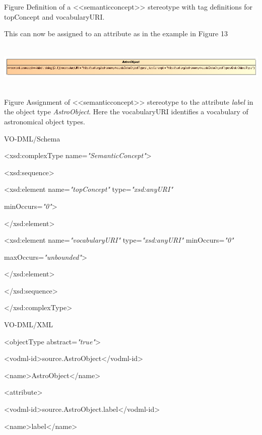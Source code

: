 \documentclass[10pt,a4paper]{ivoa}
\begin{document}
Figure Definition of a
\textless\textless semanticconcept\textgreater\textgreater{} stereotype
with tag definitions for topConcept and vocabularyURI.

This can now be assigned to an attribute as in the example in Figure 13

\includegraphics[width=7.96667in,height=0.86875in]{./media/image18.png}

Figure Assignment of
\textless\textless semanticconcept\textgreater\textgreater{} stereotype
to the attribute \emph{label} in the object type \emph{AstroObject}.
Here the vocabularyURI identifies a vocabulary of astronomical object
types.

VO-DML/Schema

\textless xsd:complexType name=\emph{"SemanticConcept"}\textgreater{}

\textless xsd:sequence\textgreater{}

\textless xsd:element name=\emph{"topConcept"} type=\emph{"xsd:anyURI"}

minOccurs=\emph{"0"}\textgreater{}

\textless/xsd:element\textgreater{}

\textless xsd:element name=\emph{"vocabularyURI"}
type=\emph{"xsd:anyURI"} minOccurs=\emph{"0"}

maxOccurs=\emph{"unbounded"}\textgreater{}

\textless/xsd:element\textgreater{}

\textless/xsd:sequence\textgreater{}

\textless/xsd:complexType\textgreater{}

VO-DML/XML

\textless objectType abstract=\emph{"true"}\textgreater{}

\textless vodml-id\textgreater source.AstroObject\textless/vodml-id\textgreater{}

\textless name\textgreater AstroObject\textless/name\textgreater{}

\textless attribute\textgreater{}

\textless vodml-id\textgreater source.AstroObject.label\textless/vodml-id\textgreater{}

\textless name\textgreater label\textless/name\textgreater{}
\end{document}

